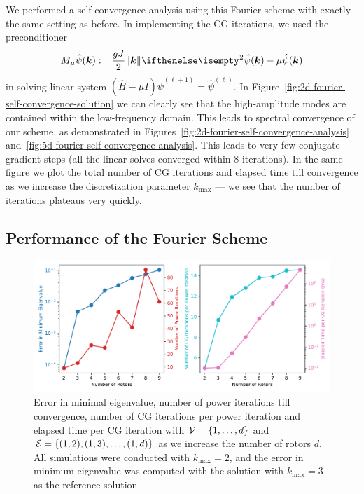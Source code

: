 \documentclass{amsart}
\begin{document}
We performed a self-convergence analysis using this Fourier scheme with exactly
the same setting as before. In implementing the CG iterations, we used the
preconditioner
\begin{equation}
  M_\mu \hat{\psi}(\Vec{k}) := \frac{g J}{2} \Norm{\Vec{k}}^2 \hat{\psi}(\Vec{k}) - \mu \hat{\psi}(\Vec{k})
\end{equation}
in solving linear system $(\hat{H} - \mu I) \widetilde{\psi}^{(\ell + 1)} =
\hat{\psi}^{(\ell)}$. In Figure~\ref{fig:2d-fourier-self-convergence-solution}
we can clearly see that the high-amplitude modes are contained within the
low-frequency domain. This leads to spectral convergence of our scheme, as
demonstrated in Figures~\ref{fig:2d-fourier-self-convergence-analysis}
and~\ref{fig:5d-fourier-self-convergence-analysis}. This leads to very few
conjugate gradient steps (all the linear solves converged within 8 iterations).
In the same figure we plot the total number of CG iterations and elapsed time
till convergence as we increase the discretization parameter $k_\text{max}$ ---
we see that the number of iterations plateaus very quickly.

\subsection{Performance of the Fourier Scheme}

\begin{figure}
  \includegraphics[width=\textwidth]{figures/2d_fourier_performance_analysis.pdf}
  \caption{Error in minimal eigenvalue, number of power iterations till
  convergence, number of CG iterations per power iteration and elapsed time per
  CG iteration with $\mathcal{V} = \{1, \ldots, d\}$ and $\mathcal{E} = \{(1, 2), (1, 3),
  \ldots, (1, d)\}$ as we increase the number of rotors $d$. All simulations
  were conducted with $k_\text{max} = 2$, and the error in minimum eigenvalue
  was computed with the solution with $k_\text{max} = 3$ as the reference
  solution.}
  \label{fig:2d-fourier-performance-analysis}
\end{figure}
\end{document}
